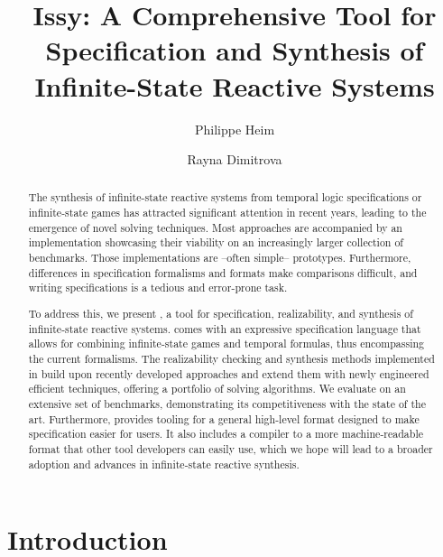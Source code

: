 \documentclass[runningheads]{llncs}
\begin{document}
\title{Issy: A Comprehensive Tool for Specification and Synthesis of Infinite-State Reactive Systems}


\author{
Philippe Heim \and
Rayna Dimitrova
}





\maketitle


\begin{abstract}
The synthesis of infinite-state reactive systems from temporal logic specifications or infinite-state games has attracted significant attention in recent years, leading to the emergence of novel solving techniques. 
Most approaches are accompanied by an implementation showcasing their viability on an increasingly larger collection of benchmarks.
Those implementations are --often simple-- prototypes. 
Furthermore, differences in specification formalisms and formats make comparisons difficult, and writing specifications is a tedious and error-prone task.

To address this,  we present \issy{},  a tool for specification, realizability, and synthesis of infinite-state reactive systems.  
\issy{} comes with an expressive specification language that allows for combining infinite-state games and temporal formulas,  thus encompassing the current formalisms.
The realizability checking and synthesis methods implemented in \issy build upon recently developed approaches and extend them with newly engineered efficient techniques, offering a portfolio of solving algorithms.
We evaluate \issy on an extensive set of benchmarks,  demonstrating its competitiveness with the state of the art.
Furthermore,  \issy{} provides tooling for a general high-level format designed to make specification easier for users.  It also includes a compiler to a more machine-readable format that other tool developers can easily use, which we hope will lead to a broader adoption and advances in infinite-state reactive synthesis.
\end{abstract}

\section{Introduction}\label{sec:intro}

\end{document}
